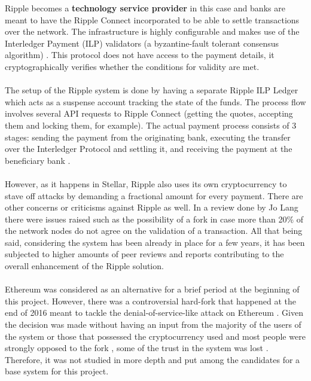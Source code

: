 \documentclass[12pt,twoside]{article}
\begin{document}
Ripple becomes a \textbf{technology service provider} in this case and banks are meant to have the Ripple Connect incorporated to be able to settle transactions over the network. The infrastructure is highly configurable and makes use of the Interledger Payment (ILP) validators (a byzantine-fault tolerant consensus algorithm) \cite{Ripple:ILP} \cite{Ripple:CP}. This protocol does not have access to the payment details, it cryptographically verifies whether the conditions for validity are met. 
\\ \\
The setup of the Ripple system is done by having a separate Ripple ILP Ledger which acts as a suspense account tracking the state of the funds. The process flow involves several API requests to Ripple Connect (getting the quotes, accepting them and locking them, for example). The actual payment process consists of 3 stages: sending the payment from the originating bank, executing the transfer over the Interledger Protocol and settling it, and receiving the payment at the beneficiary bank \cite{Ripple:TP}.
\\ \\
However, as it happens in Stellar, Ripple also uses its own cryptocurrency to stave off attacks by demanding a fractional amount for every payment. There are other concerns or criticisms against Ripple as well. In a review done by Jo Lang \cite{JoLang} there were issues raised such as the possibility of a fork in case more than 20\% of the network nodes do not agree on the validation of a transaction. All that being said, considering the system has been already in place for a few years, it has been subjected to higher amounts of peer reviews and reports contributing to the overall enhancement of the Ripple solution.
\\ \\
Ethereum was considered as an alternative for a brief period at the beginning of this project. However, there was a controversial hard-fork that happened at the end of 2016 meant to tackle the denial-of-service-like attack on Ethereum \cite{ethblog}. Given the decision was made without having an input from the majority of the users of the system or those that possessed the cryptocurrency used and most people were strongly opposed to the fork \cite{ethoped}, some of the trust in the system was lost \cite{ethhf}. Therefore, it was not studied in more depth and put among the candidates for a base system for this project. 
\end{document}

